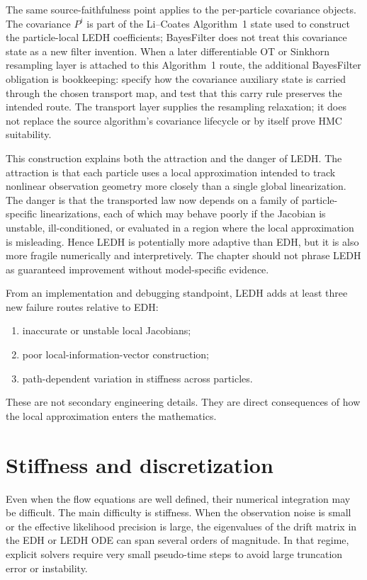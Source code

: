 The same source-faithfulness point applies to the per-particle covariance
objects.  The covariance $P^i$ is part of the Li--Coates Algorithm~1 state used
to construct the particle-local LEDH coefficients; BayesFilter does not treat
this covariance state as a new filter invention.  When a later differentiable
OT or Sinkhorn resampling layer is attached to this Algorithm~1 route, the
additional BayesFilter obligation is bookkeeping: specify how the covariance
auxiliary state is carried through the chosen transport map, and test that this
carry rule preserves the intended route.  The transport layer supplies the
resampling relaxation; it does not replace the source algorithm's covariance
lifecycle or by itself prove HMC suitability.

This construction explains both the attraction and the danger of LEDH.  The
attraction is that each particle uses a local approximation intended to track
nonlinear observation geometry more closely than a single global
linearization.  The danger is that the transported law now depends on a family
of particle-specific linearizations, each of which may behave poorly if the
Jacobian is unstable, ill-conditioned, or evaluated in a region where the local
approximation is misleading.  Hence LEDH is potentially more adaptive than EDH,
but it is also more fragile numerically and interpretively.  The chapter should
not phrase LEDH as guaranteed improvement without model-specific evidence.

From an implementation and debugging standpoint, LEDH adds at least three new
failure routes relative to EDH:
\begin{enumerate}[label=(\roman*)]
  \item inaccurate or unstable local Jacobians;
  \item poor local-information-vector construction;
  \item path-dependent variation in stiffness across particles.
\end{enumerate}
These are not secondary engineering details.  They are direct consequences of
how the local approximation enters the mathematics.

\section{Stiffness and discretization}
\label{sec:bf-pff-stiffness}

Even when the flow equations are well defined, their numerical integration may
be difficult.  The main difficulty is stiffness.  When the observation noise is
small or the effective likelihood precision is large, the eigenvalues of the
drift matrix in the EDH or LEDH ODE can span several orders of magnitude.  In
that regime, explicit solvers require very small pseudo-time steps to avoid
large truncation error or instability.

